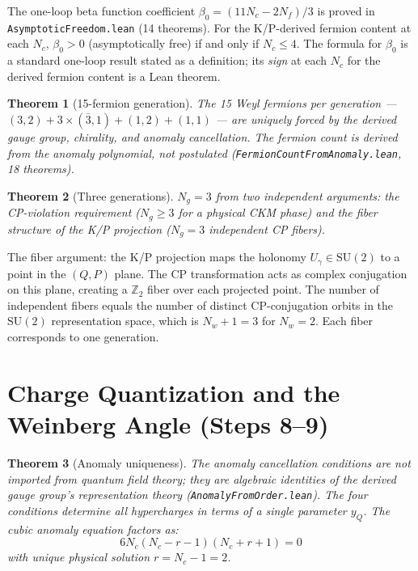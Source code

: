 \documentclass[11pt,letterpaper]{article}
\newtheorem{theorem}{Theorem}
\begin{document}
The one-loop beta function coefficient
$\beta_0 = (11 N_c - 2 N_f)/3$ is proved in
\texttt{Asymptotic\-Freedom.lean} (14 theorems).  For the
K/P-derived fermion content at each $N_c$, $\beta_0 > 0$
(asymptotically free) if and only if $N_c \leq 4$.  The formula
for $\beta_0$ is a standard one-loop result stated as a definition;
its \emph{sign} at each $N_c$ for the derived fermion content is a
Lean theorem.

\begin{theorem}[15-fermion generation]
\label{thm:15fermions}
The 15 Weyl fermions per generation --- $(3,2) + 3 \times (\bar{3},1)
+ (1,2) + (1,1)$ --- are uniquely forced by the derived gauge group,
chirality, and anomaly cancellation.  The fermion count is
\emph{derived} from the anomaly polynomial, not postulated
(\texttt{FermionCountFromAnomaly.lean}, 18 theorems).
\end{theorem}

\begin{theorem}[Three generations]
\label{thm:3gen}
$N_g = 3$ from two independent arguments: the CP-violation requirement
($N_g \geq 3$ for a physical CKM phase) and the fiber structure of
the K/P projection ($N_g = 3$ independent CP fibers).
\end{theorem}

\noindent The fiber argument: the K/P projection maps the holonomy
$U_\gamma \in \mathrm{SU}(2)$ to a point in the $(Q, P)$ plane.
The CP transformation acts as complex conjugation on this plane,
creating a $\mathbb{Z}_2$ fiber over each projected point.  The
number of independent fibers equals the number of distinct
CP-conjugation orbits in the $\mathrm{SU}(2)$ representation space,
which is $N_w + 1 = 3$ for $N_w = 2$.  Each fiber corresponds to
one generation.

\section{Charge Quantization and the Weinberg Angle (Steps 8--9)}

\begin{theorem}[Anomaly uniqueness]
\label{thm:anomaly}
The anomaly cancellation conditions are not imported from quantum
field theory; they are algebraic identities of the derived gauge
group's representation theory (\texttt{AnomalyFromOrder.lean}).
The four conditions determine all hypercharges in
terms of a single parameter $y_Q$.  The cubic anomaly equation
factors as:
\[
  6 N_c (N_c - r - 1)(N_c + r + 1) = 0
\]
with unique physical solution $r = N_c - 1 = 2$.
\end{theorem}
\end{document}
